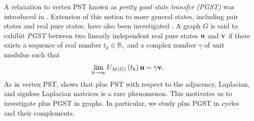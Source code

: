 \documentclass[12pt,a4paper]{article}
\def \e {{\bf e}}
\def \u {{\bf u}}
\def \v {{\bf v}}
\def \e {{\mathbf e}}
\newcommand{\ob}[1]{\left(#1\right)}
\begin{document}
A relaxation to vertex PST known as \emph{pretty good state transfer (PGST)} was introduced in \cite{god1, vin}. Extension of this notion to more general states, including pair states and real pure states, have also been investigated \cite{god8, pal11, ojha1, pal10}. A graph  $G$ is said to exhibit \emph{PGST} between two linearly independent real pure states $\u$ and $\v$ if there exists a sequence of real number $t_k\in\mathbb{R},$ and a complex number $\gamma$ of unit modulus such that 
\begin{equation}\label{5eq2}
       \lim_{k \to \infty}U_{M(G)}\ob{t_k}\u=\gamma \v.
   \end{equation}
   As in vertex PST, \cite{god7} shows that plus PST with respect to the adjacency, Laplacian, and signless Laplacian matrices is a rare phenomenon. This motivates us to investigate plus PGST in graphs. In particular, we study plus PGST in cycles and their complements. 
   
   
\end{document}
